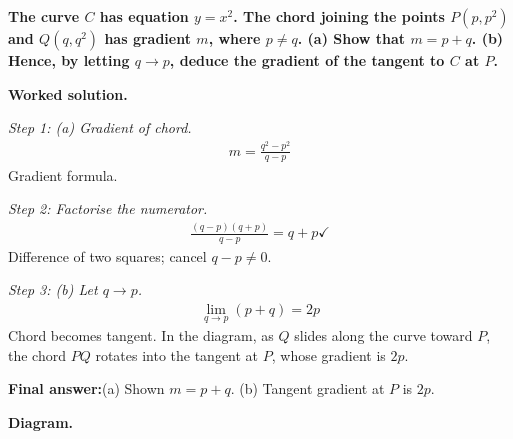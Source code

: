 \documentclass[11pt]{article}
\newcommand{\question}[1]{\par\medskip\noindent\textbf{#1}\par}
\begin{document}
\question{The curve \( C \) has equation \( y = x^2 \). The chord joining the points \( P(p, p^2) \) and \( Q(q, q^2) \) has gradient \( m \), where \( p \neq q \). (a) Show that \( m = p + q \). (b) Hence, by letting \( q \to p \), deduce the gradient of the tangent to \( C \) at \( P \).}

\textbf{Worked solution.}

\textit{Step 1: (a) Gradient of chord.}
\[\begin{gathered}
m = \frac{q^2 - p^2}{q - p}
\end{gathered}\]
Gradient formula.

\textit{Step 2: Factorise the numerator.}
\[\begin{gathered}
\frac{(q - p)(q + p)}{q - p} = q + p \checkmark
\end{gathered}\]
Difference of two squares; cancel \( q - p \neq 0 \).

\textit{Step 3: (b) Let \( q \to p \).}
\[\begin{gathered}
\lim_{q \to p}(p + q) = 2p
\end{gathered}\]
Chord becomes tangent. In the diagram, as \( Q \) slides along the curve toward \( P \), the chord \( PQ \) rotates into the tangent at \( P \), whose gradient is \( 2p \).

\begin{answerbox}
\textbf{Final answer:}\quad (a) Shown \(\displaystyle  m = p + q \). \quad  (b) Tangent gradient at \(\displaystyle  P \) is \(\displaystyle  2p \).
\end{answerbox}
\textbf{Diagram.}
\end{document}
